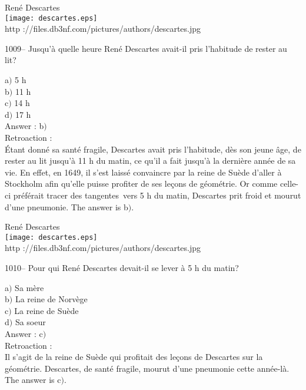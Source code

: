﻿\documentclass[letterpaper, 12pt]{article}
\begin{document}
        \begin{center}
        Ren\'e Descartes\\
    \texttt{[image: descartes.eps]}\\
        {\footnotesize http
://files.db3nf.com/pictures/authors/descartes.jpg}
    \end{center}

1009-- Jusqu'\`a quelle heure Ren\'e Descartes avait-il pris
l'habitude de rester au lit?

a$)$ 5 h \\
b$)$ 11 h \\
c$)$ 14 h \\
d$)$ 17 h\\

Answer : b$)$\\

Retroaction :\\
\'Etant donn\'e sa sant\'e fragile, Descartes avait pris l'habitude,
d\`es son jeune \^age, de rester au lit jusqu'\`a 11 h du matin, ce
qu'il a fait jusqu'\`a la derni\`ere ann\'ee de sa vie.  En effet,
en 1649, il s'est laiss\'e convaincre par la reine de Su\`ede
d'aller \`a Stockholm afin qu'elle puisse profiter de ses le\c cons
de g\'eom\'etrie.  Or comme celle-ci pr\'ef\'erait \og tracer des
tangentes\fg\ vers 5 h du matin, Descartes prit froid et mourut
d'une pneumonie.
The answer is b$)$.\\

        \begin{center}
        Ren\'e Descartes\\
    \texttt{[image: descartes.eps]}\\
        {\footnotesize http
://files.db3nf.com/pictures/authors/descartes.jpg}
    \end{center}

1010-- Pour qui Ren\'e Descartes devait-il se lever \`a 5 h du
matin?

a$)$ Sa m\`ere \\
b$)$ La reine de Norv\`ege \\
c$)$ La reine de Su\`ede \\
d$)$ Sa soeur\\

Answer : c$)$\\

Retroaction : \\
Il s'agit de la reine de Su\`ede qui profitait des le\c cons de
Descartes sur la g\'eom\'etrie. Descartes, de sant\'e fragile,
mourut d'une pneumonie cette ann\'ee-l\`a.
The answer is c$)$.\\
\end{document}
